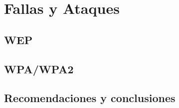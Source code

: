 \chapter{Fallas y Ataques}
\section{WEP}
\section{WPA/WPA2}
\section{Recomendaciones y conclusiones}
